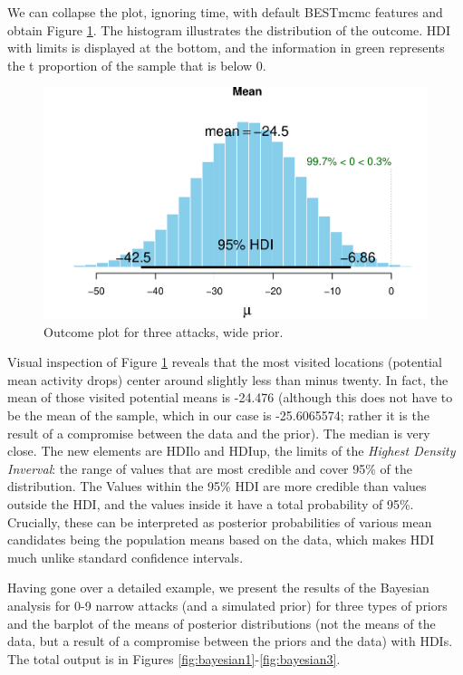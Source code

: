 \documentclass[10pt,]{scrartcl}
\begin{document}
We can collapse the plot, ignoring time, with default \textsf{BESTmcmc}
features and obtain Figure \ref{fig:mw3plot}. The histogram illustrates
the distribution of the outcome. HDI with limits is displayed at the
bottom, and the information in green represents the t proportion of the
sample that is below 0.

\begin{figure}[h!]

\begin{center}\includegraphics[width=1\linewidth]{redditAnalysisWalkthrough_files/figure-latex/unnamed-chunk-51-1} \end{center}
\caption{Outcome plot for three attacks, wide prior.}
\label{fig:mw3plot}
\end{figure}

Visual inspection of Figure \ref{fig:mw3plot} reveals that the most
visited locations (potential mean activity drops) center around slightly
less than minus twenty. In fact, the mean of those visited potential
means is -24.476 (although this does not have to be the mean of the
sample, which in our case is -25.6065574; rather it is the result of a
compromise between the data and the prior). The median is very close.
The new elements are HDIlo and HDIup, the limits of the
\emph{Highest Density Inverval}: the range of values that are most
credible and cover 95\% of the distribution. The Values within the 95\%
HDI are more credible than values outside the HDI, and the values inside
it have a total probability of 95\%. Crucially, these can be interpreted
as posterior probabilities of various mean candidates being the
population means based on the data, which makes HDI much unlike standard
confidence intervals.

Having gone over a detailed example, we present the results of the
Bayesian analysis for 0-9 narrow attacks (and a simulated prior) for
three types of priors and the barplot of the means of posterior
distributions (not the means of the data, but a result of a compromise
between the priors and the data) with HDIs. The total output is in
Figures \ref{fig:bayesian1}-\ref{fig:bayesian3}.
\end{document}
